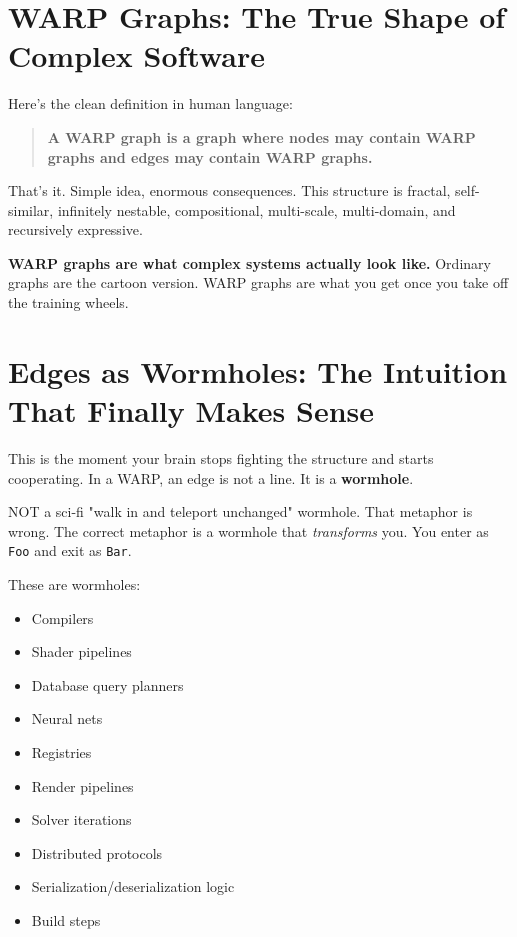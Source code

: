 \section{WARP Graphs: The True Shape of Complex Software}
\label{sec:rmg-definition}

Here's the clean definition in human language:

\begin{quote}
\textbf{A WARP graph is a graph where nodes may contain WARP graphs and edges may contain WARP graphs.}
\end{quote}

That's it. Simple idea, enormous consequences. This structure is fractal, self-similar, infinitely nestable, compositional, multi-scale, multi-domain, and recursively expressive.

\textbf{WARP graphs are what complex systems actually look like.} Ordinary graphs are the cartoon version. WARP graphs are what you get once you take off the training wheels.

\section{Edges as Wormholes: The Intuition That Finally Makes Sense}
\label{sec:edges-wormholes}

This is the moment your brain stops fighting the structure and starts cooperating. In a WARP, an edge is not a line. It is a \textbf{wormhole}.

NOT a sci-fi "walk in and teleport unchanged" wormhole. That metaphor is wrong. The correct metaphor is a wormhole that \textit{transforms} you. You enter as \texttt{Foo} and exit as \texttt{Bar}.

These are wormholes:
\begin{itemize}
    \item Compilers
    \item Shader pipelines
    \item Database query planners
    \item Neural nets
    \item Registries
    \item Render pipelines
    \item Solver iterations
    \item Distributed protocols
    \item Serialization/deserialization logic
    \item Build steps
\end{itemize}

